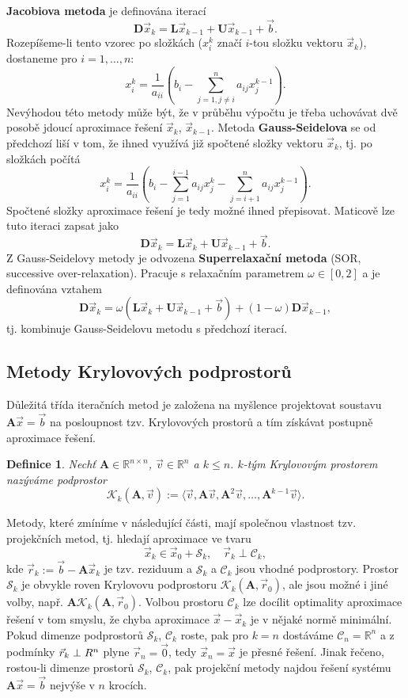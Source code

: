 \documentclass{article}
\newtheorem{df}{Definice}
\newcommand{\0}{\vec{0}}
\newcommand{\A}{\mat A}
\newcommand{\bb}{\vec{b}}
\newcommand{\lo}[1]{\langle #1\rangle}
\newcommand{\mat}[1]{\mathbf{#1}}
\newcommand{\R}{\mathbb R}
\newcommand{\rr}{\vec{r}}
\newcommand{\vv}{\vec{v}}
\newcommand{\xx}{\vec{x}}
\begin{document}
{\bf Jacobiova metoda} je definována iterací
$$ \mat D\xx_k=\mat L\xx_{k-1} + \mat U\xx_{k-1} + \bb. $$
Rozepíšeme-li tento vzorec po složkách ($x_i^k$ značí $i$-tou složku vektoru $\xx_k$), dostaneme pro $i=1,\ldots,n$:
$$ x_i^k = \frac1{a_{ii}}\left(b_i-\sum_{j=1,j\neq i}^n a_{ij}x_j^{k-1}\right). $$
Nevýhodou této metody může být, že v průběhu výpočtu je třeba uchovávat dvě posobě jdoucí aproximace řešení $\xx_k$, $\xx_{k-1}$.
Metoda {\bf Gauss-Seidelova} se od předchozí liší v tom, že ihned využívá již spočtené složky vektoru $\xx_k$, tj. po složkách počítá
$$ x_i^k = \frac1{a_{ii}}\left(b_i-\sum_{j=1}^{i-1} a_{ij}x_j^k-\sum_{j=i+1}^n a_{ij}x_j^{k-1}\right). $$
Spočtené složky aproximace řešení je tedy možné ihned přepisovat.
Maticově lze tuto iteraci zapsat jako
$$ \mat D\xx_k=\mat L\xx_k+\mat U\xx_{k-1}+\bb. $$
Z Gauss-Seidelovy metody je odvozena {\bf Superrelaxační metoda} (SOR, successive over-relaxation).
Pracuje s relaxačním parametrem $\omega\in[0,2]$ a je definována vztahem
$$ \mat D\xx_k = \omega(\mat L\xx_k+\mat U\xx_{k-1}+\bb) + (1-\omega)\mat D\xx_{k-1}, $$
tj. kombinuje Gauss-Seidelovu metodu s předchozí iterací.






\subsection{Metody Krylovových podprostorů}

Důležitá třída iteračních metod je založena na myšlence projektovat soustavu $\A\xx=\bb$ na posloupnost tzv. Krylovových prostorů a tím získávat postupně aproximace řešení.
\begin{df}
Nechť $\A\in\R^{n\times n}$, $\vv\in\R^n$ a $k\le n$.
$k$-tým Krylovovým prostorem nazýváme podprostor
$$ \mathcal K_k(\A,\vv):=\lo{\vv,\A\vv,\A^2\vv,\ldots,\A^{k-1}\vv}. $$
\end{df}
Metody, které zmíníme v následující části, mají společnou vlastnost tzv. projekčních metod, tj. hledají aproximace ve tvaru
$$ \xx_k\in \xx_0 + \mathcal S_k, \quad \rr_k\perp\mathcal C_k, $$
kde $\rr_k:=\bb-\A\xx_k$ je tzv. reziduum a $\mathcal S_k$ a $\mathcal C_k$ jsou vhodné podprostory.
Prostor $\mathcal S_k$ je obvykle roven Krylovovu podprostoru $\mathcal K_k(\A,\rr_0)$, ale jsou možné i jiné volby, např. $\A\mathcal K_k(\A,\rr_0)$.
Volbou prostoru $\mathcal C_k$ lze docílit optimality aproximace řešení v tom smyslu, že chyba aproximace $\xx-\xx_k$ je v nějaké normě minimální.
Pokud dimenze podprostorů $\mathcal S_k$, $\mathcal C_k$ roste, pak pro $k=n$ dostáváme $\mathcal C_n=\R^n$ a z podmínky $\rr_k\perp\mathcal\R^n$ plyne $\rr_n=\0$, tedy $\xx_n=\xx$ je přesné řešení.
Jinak řečeno, rostou-li dimenze prostorů $\mathcal S_k$, $\mathcal C_k$, pak projekční metody najdou řešení systému $\A\xx=\bb$ nejvýše v $n$ krocích.
\end{document}
